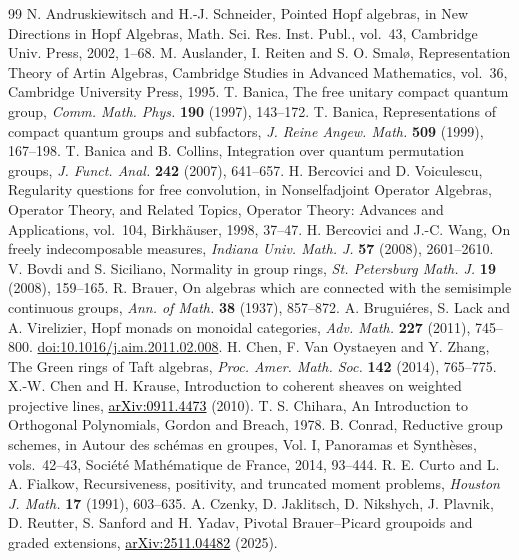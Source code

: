 \documentclass[11pt,reqno]{amsart}
\theoremstyle{definition}
\begin{document}
{\footnotesize\begin{thebibliography}{99}
 N. Andruskiewitsch and H.-J. Schneider, Pointed Hopf algebras, in New Directions in Hopf Algebras, Math. Sci. Res. Inst. Publ., vol.~43, Cambridge Univ. Press, 2002, 1--68.
 M. Auslander, I. Reiten and S. O. Smal\o,
Representation Theory of Artin Algebras,
Cambridge Studies in Advanced Mathematics, vol.~36, Cambridge University Press, 1995.
 T. Banica, The free unitary compact quantum group,
\emph{Comm. Math. Phys.} \textbf{190} (1997), 143--172.
T. Banica, Representations of compact quantum groups and subfactors,
\emph{J. Reine Angew. Math.} \textbf{509} (1999), 167--198.
 T. Banica and B. Collins, Integration over quantum permutation groups, \emph{J. Funct. Anal.} \textbf{242} (2007), 641--657.
 H. Bercovici and D. Voiculescu, Regularity questions for free convolution, in Nonselfadjoint Operator Algebras, Operator Theory, and Related Topics, Operator Theory: Advances and Applications, vol.~104, Birkh\"auser, 1998, 37--47.
 H. Bercovici and J.-C. Wang, On freely indecomposable measures, \emph{Indiana Univ. Math. J.} \textbf{57} (2008), 2601--2610.
 V. Bovdi and S. Siciliano, Normality in group rings, \emph{St. Petersburg Math. J.} \textbf{19} (2008), 159--165.
 R. Brauer, On algebras which are connected with the semisimple continuous groups, \emph{Ann. of Math.} \textbf{38} (1937), 857--872.
 A. Brugui\'eres, S. Lack and A. Virelizier, Hopf monads on monoidal categories, \emph{Adv. Math.} \textbf{227} (2011), 745--800. \href{https://doi.org/10.1016/j.aim.2011.02.008}{doi:10.1016/j.aim.2011.02.008}.
 H. Chen, F. Van Oystaeyen and Y. Zhang, The Green rings of Taft algebras,
\emph{Proc. Amer. Math. Soc.} \textbf{142} (2014), 765--775.
 X.-W. Chen and H. Krause, Introduction to coherent sheaves on weighted projective lines,
\href{https://arxiv.org/pdf/0911.4473}{\textcolor{black}{\mbox{arXiv:0911.4473}}} (2010).
 T. S. Chihara, An Introduction to Orthogonal Polynomials, Gordon and Breach, 1978.
 B. Conrad, Reductive group schemes, in Autour des sch\'emas en groupes, Vol. I, Panoramas et Synth\`eses, vols.~42--43, Soci\'et\'e Math\'ematique de France, 2014, 93--444.
 R. E. Curto and L. A. Fialkow, Recursiveness, positivity, and truncated moment problems, \emph{Houston J. Math.} \textbf{17} (1991), 603--635.
 A. Czenky, D. Jaklitsch, D. Nikshych, J. Plavnik, D. Reutter, S. Sanford and H. Yadav, Pivotal Brauer--Picard groupoids and graded extensions, \href{https://arxiv.org/pdf/2511.04482}{\textcolor{black}{\mbox{arXiv:2511.04482}}} (2025).

\end{thebibliography}}
\end{document}
